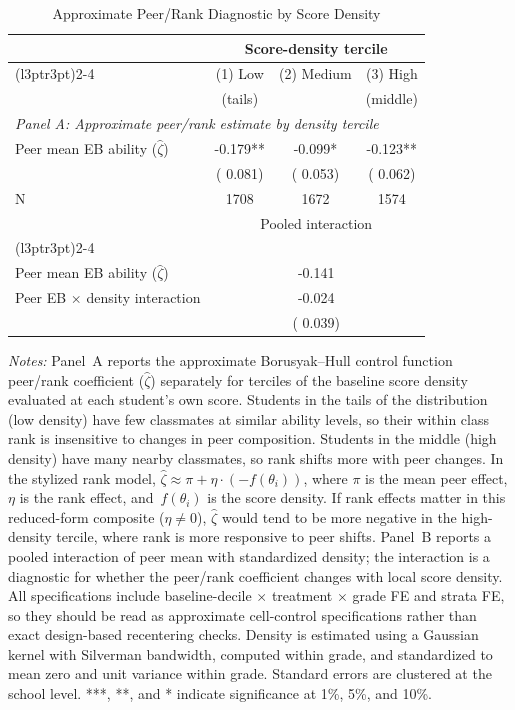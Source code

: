 \begin{table}[H]
\centering
\caption{Approximate Peer/Rank Diagnostic by Score Density}
\label{tab:density_decomp}
\begin{threeparttable}
\begin{tabular}[t]{lccc}
\toprule
 & \multicolumn{3}{c}{Score-density tercile} \\
\cmidrule(l{3pt}r{3pt}){2-4}
 & (1) Low & (2) Medium & (3) High \\
 & (tails) & & (middle) \\
\midrule
\multicolumn{4}{l}{\textit{Panel A: Approximate peer/rank estimate by density tercile}} \\
Peer mean EB ability ($\hat{\zeta}$) &  -0.179** &  -0.099* &  -0.123** \\
 & (  0.081) & (  0.053) & (  0.062) \\
N & 1708 & 1672 & 1574 \\
\addlinespace
\midrule
 & \multicolumn{3}{c}{Pooled interaction} \\
\cmidrule(l{3pt}r{3pt}){2-4}
\multicolumn{4}{l}{\textit{Panel B: Interaction specification}} \\
Peer mean EB ability ($\hat{\zeta}$) & \multicolumn{3}{c}{ -0.141} \\
Peer EB $\times$ density interaction & \multicolumn{3}{c}{ -0.024} \\
 & \multicolumn{3}{c}{(  0.039)} \\
\bottomrule
\end{tabular}
\begin{tablenotes}
\scriptsize
\setlength{\emergencystretch}{2em}
\item \textit{Notes:} Panel~A reports the approximate Borusyak--Hull control function peer/rank coefficient ($\hat{\zeta}$) separately for terciles of the baseline score density evaluated at each student's own score. Students in the tails of the distribution (low density) have few classmates at similar ability levels, so their within class rank is insensitive to changes in peer composition. Students in the middle (high density) have many nearby classmates, so rank shifts more with peer changes. In the stylized rank model, $\hat{\zeta} \approx \pi + \eta \cdot (-f(\theta_i))$, where $\pi$ is the mean peer effect, $\eta$ is the rank effect, and $\,f(\theta_i)$ is the score density. If rank effects matter in this reduced-form composite ($\eta \neq 0$), $\hat{\zeta}$ would tend to be more negative in the high-density tercile, where rank is more responsive to peer shifts. Panel~B reports a pooled interaction of peer mean with standardized density; the interaction is a diagnostic for whether the peer/rank coefficient changes with local score density. All specifications include baseline-decile $\times$ treatment $\times$ grade FE and strata FE, so they should be read as approximate cell-control specifications rather than exact design-based recentering checks. Density is estimated using a Gaussian kernel with Silverman bandwidth, computed within grade, and standardized to mean zero and unit variance within grade. Standard errors are clustered at the school level. ***, **, and * indicate significance at 1\%, 5\%, and 10\%.

\end{tablenotes}
\end{threeparttable}
\end{table}
